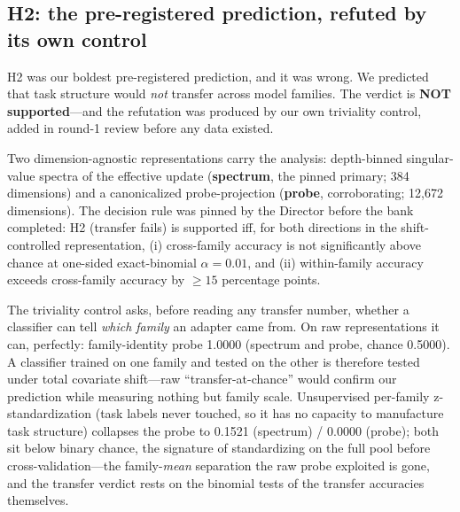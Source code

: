 \documentclass[10pt]{article}
\begin{document}
\subsection{H2: the pre-registered prediction, refuted by its own control}
\label{sec:h2}

H2 was our boldest pre-registered prediction, and it was wrong. We
predicted that task structure would \emph{not} transfer across model
families. The verdict is \textbf{NOT supported}---and the refutation was
produced by our own triviality control, added in round-1 review before any
data existed.

Two dimension-agnostic representations carry the analysis: depth-binned
singular-value spectra of the effective update (\textbf{spectrum}, the
pinned primary; 384 dimensions) and a canonicalized probe-projection
(\textbf{probe}, corroborating; 12{,}672 dimensions). The decision rule was
pinned by the Director before the bank completed: H2 (transfer fails) is
supported iff, for both directions in the shift-controlled representation,
(i) cross-family accuracy is not significantly above chance at one-sided
exact-binomial $\alpha = 0.01$, and (ii) within-family accuracy exceeds
cross-family accuracy by $\ge 15$ percentage points.

The triviality control asks, before reading any transfer number, whether a
classifier can tell \emph{which family} an adapter came from. On raw
representations it can, perfectly: family-identity probe 1.0000 (spectrum
and probe, chance 0.5000). A classifier trained on one family and tested
on the other is therefore tested under total covariate shift---raw
``transfer-at-chance'' would confirm our prediction while measuring
nothing but family scale. Unsupervised per-family z-standardization
(task labels never touched, so it has no capacity to manufacture task
structure) collapses the probe to 0.1521 (spectrum) / 0.0000 (probe);
both sit below binary chance, the signature of standardizing on the full
pool before cross-validation---the family-\emph{mean} separation the raw
probe exploited is gone, and the transfer verdict rests on the binomial
tests of the transfer accuracies themselves.
\end{document}
